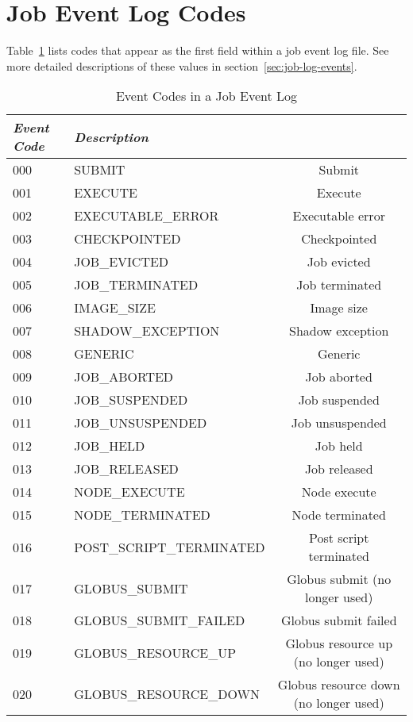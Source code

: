 \section{Job Event Log Codes}
Table~\ref{table:user-log-event-codes} lists codes that appear as 
the first field within a job event log file.
See more detailed descriptions of these values in
section~\ref{sec:job-log-events}.
\begin{table}[ht]
\centering
\caption{\label{table:user-log-event-codes}Event Codes in a Job Event Log}
\begin{tabular}{|l|l|c|} \hline
\emph{Event Code} & \emph{Description}   \\ \hline \hline
000   & SUBMIT  & Submit  \\ \hline
001   & EXECUTE & Execute  \\ \hline
002   & EXECUTABLE\_ERROR & Executable error  \\ \hline
003   & CHECKPOINTED & Checkpointed  \\ \hline
004   & JOB\_EVICTED & Job evicted  \\ \hline
005   & JOB\_TERMINATED & Job terminated  \\ \hline
006   & IMAGE\_SIZE & Image size  \\ \hline
007   & SHADOW\_EXCEPTION & Shadow exception  \\ \hline
008   & GENERIC & Generic  \\ \hline
009   & JOB\_ABORTED & Job aborted  \\ \hline
010   & JOB\_SUSPENDED & Job suspended  \\ \hline
011   & JOB\_UNSUSPENDED & Job unsuspended  \\ \hline
012   & JOB\_HELD & Job held  \\ \hline
013   & JOB\_RELEASED & Job released  \\ \hline
014   & NODE\_EXECUTE & Node execute  \\ \hline
015   & NODE\_TERMINATED & Node terminated  \\ \hline
016   & POST\_SCRIPT\_TERMINATED & Post script terminated  \\ \hline
017   & GLOBUS\_SUBMIT & Globus submit (no longer used)  \\ \hline
018   & GLOBUS\_SUBMIT\_FAILED & Globus submit failed  \\ \hline
019   & GLOBUS\_RESOURCE\_UP & Globus resource up (no longer used)  \\ \hline
020   & GLOBUS\_RESOURCE\_DOWN & Globus resource down (no longer used)  \\ \hline

\end{tabular}
\end{table}
